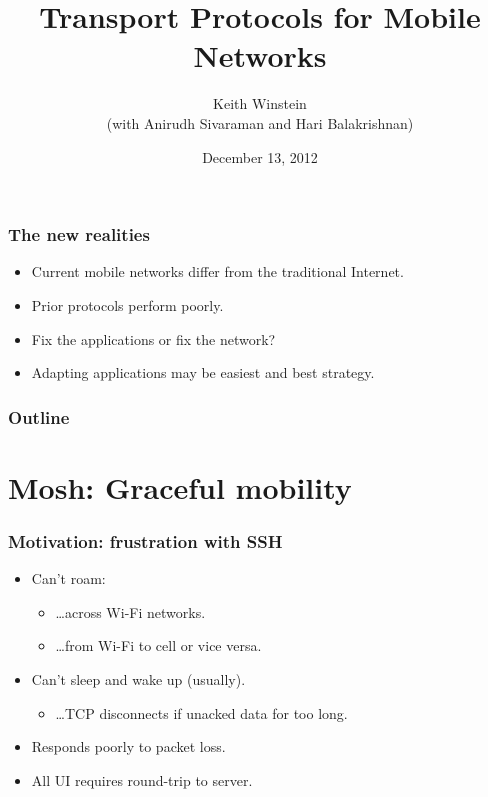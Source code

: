 \documentclass[svgnames]{beamer}
\title{Transport Protocols for Mobile Networks}
\author{Keith Winstein \\(with Anirudh Sivaraman and Hari Balakrishnan)}
\institute{M.I.T.~CSAIL}
\date{December 13, 2012}
\begin{document}
\begin{frame}[plain]

\titlepage

\end{frame}

\begin{frame}
\frametitle{The new realities}

\begin{itemize}

\item Current mobile networks differ from the traditional Internet.

\item Prior protocols perform poorly.

\item Fix the applications or fix the network?

\item Adapting applications may be easiest and best strategy.

\end{itemize}

\end{frame}

\begin{frame}
\frametitle{Outline}
\tableofcontents{}

\end{frame}

\section{Mosh: Graceful mobility}

\begin{frame}
\frametitle{Motivation: frustration with SSH}

\begin{itemize}

\item Can't roam:

\begin{itemize}
\item \ldots across Wi-Fi networks.
\item \ldots from Wi-Fi to cell or vice versa.
\end{itemize}

\item Can't sleep and wake up (usually).

\begin{itemize}
\item \ldots TCP disconnects if unacked data for too long.
\end{itemize}

\item Responds poorly to packet loss.

\item All UI requires round-trip to server.

\end{itemize}

\end{frame}
\end{document}
